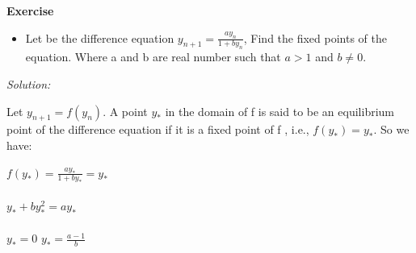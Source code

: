 \documentclass[paper=9in:6in,pagesize=pdftex,headinclude=on,footinclude=on,10pt,bibtotoc,pointlessnumbers,normalheadings,DIV=9,twoside=false]{scrbook}
\begin{document}
\date{}


\begin{large} 
 \textbf{Exercise}
\end{large} 
\begin{itemize} 
\item Let be the difference equation $y_{n+1} =\frac{a y_n}{1+ b y_n}$, Find the fixed points of the equation. Where a and b are real number such that $a>1$ and $b \neq 0$.\\
\end{itemize}

\begin{large}
\textit{Solution:\\}
\end{large}

 
\begin{text}
Let $y_{n+1} = f(y_n)$. A point $y_*$ in the domain of f is said to be an equilibrium point of the difference equation if it is a fixed point of f , i.e., $f(y_*) = y_*$. So we have:
\end{text}

\begin{center}
$f(y_*)= \frac{ay_*}{1+by_*} = y_* $ \ \\
\ \\
$y_* + by_*^2 = ay_* $ \ \\

\ \\

 $y_* = 0$ \hspace{1cm} $ y_* = \frac{a-1}{b}$
\end{center}
\end{document}
